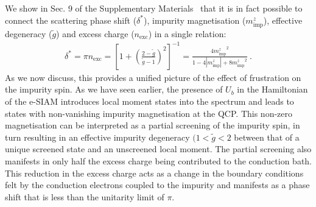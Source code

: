 \documentclass{iopart}
\begin{document}
We show in Sec. 9 of the Supplementary Materials~\cite{supp_mat} that it is in fact  possible to connect the scattering phase shift ($\delta^{*}$), impurity magnetisation ($m_{\text{imp}}^{z}$), effective degeneracy ($\tilde{g}$) and excess charge ($n_{\text{exc}}$) in a single relation:
\begin{eqnarray}\label{phase-mag}
	\delta^* = \pi n_\text{exc} = \left[1 + \left(\frac{2-\tilde g}{\tilde g-1}\right)^2\right]^{-1} = \frac{4{m_{\text{imp}}^z}^2}{1 - 4|m_{\text{imp}}^z| + 8{m_{\text{imp}}^z}^2}~.
\end{eqnarray}
As we now discuss, this provides a unified picture of the effect of frustration on the impurity spin. As we have seen earlier, the presence of \(U_b\) in the Hamiltonian of the e-SIAM introduces local moment states into the spectrum and leads to states with non-vanishing impurity magnetisation at the QCP. This non-zero magnetisation can be interpreted as a partial screening of the impurity spin, in turn resulting in an effective impurity degeneracy \((1 < \tilde g < 2\) between that of a unique screened state and an unscreened local moment. The partial screening also manifests in only half the excess charge being contributed to the conduction bath. This reduction in the excess charge acts as a change in the boundary conditions felt by the conduction electrons coupled to the impurity and manifests as a phase shift that is less than the unitarity limit of \(\pi\). 
\end{document}
